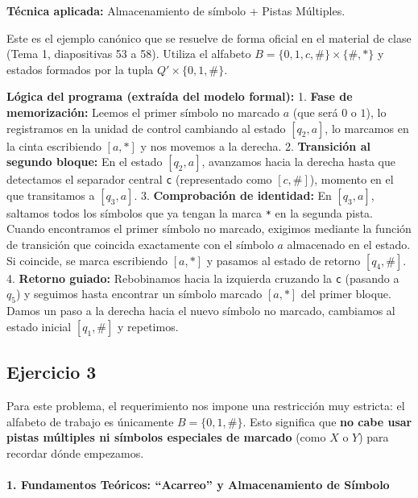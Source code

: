 \documentclass[12pt]{book} %
\begin{document}
\textbf{Técnica aplicada:} Almacenamiento de símbolo + Pistas Múltiples.

Este es el ejemplo canónico que se resuelve de forma oficial en el
material de clase (Tema 1, diapositivas 53 a 58). Utiliza el alfabeto
\(B = \{0, 1, c, \#\} \times \{\#, *\}\) y estados formados por la tupla
\(Q' \times \{0, 1, \#\}\).

\textbf{Lógica del programa (extraída del modelo formal):} 1.
\textbf{Fase de memorización:} Leemos el primer símbolo no marcado \(a\)
(que será \(0\) o \(1\)), lo registramos en la unidad de control
cambiando al estado \([q_2, a]\), lo marcamos en la cinta escribiendo
\([a, *]\) y nos movemos a la derecha. 2. \textbf{Transición al segundo
bloque:} En el estado \([q_2, a]\), avanzamos hacia la derecha hasta que
detectamos el separador central \texttt{c} (representado como
\([c, \#]\)), momento en el que transitamos a \([q_3, a]\). 3.
\textbf{Comprobación de identidad:} En \([q_3, a]\), saltamos todos los
símbolos que ya tengan la marca \texttt{*} en la segunda pista. Cuando
encontramos el primer símbolo no marcado, exigimos mediante la función
de transición que coincida exactamente con el símbolo \(a\) almacenado
en el estado. Si coincide, se marca escribiendo \([a, *]\) y pasamos al
estado de retorno \([q_4, \#]\). 4. \textbf{Retorno guiado:} Rebobinamos
hacia la izquierda cruzando la \texttt{c} (pasando a \(q_5\)) y seguimos
hasta encontrar un símbolo marcado \([a, *]\) del primer bloque. Damos
un paso a la derecha hacia el nuevo símbolo no marcado, cambiamos al
estado inicial \([q_1, \#]\) y repetimos.

\hypertarget{ejercicio-3}{%
\subsection{Ejercicio 3}\label{ejercicio-3}}

Para este problema, el requerimiento nos impone una restricción muy
estricta: el alfabeto de trabajo es únicamente \(B = \{0, 1, \#\}\).
Esto significa que \textbf{no cabe usar pistas múltiples ni símbolos
especiales de marcado} (como \(X\) o \(Y\)) para recordar dónde
empezamos.

\hypertarget{fundamentos-teuxf3ricos-acarreo-y-almacenamiento-de-suxedmbolo}{%
\paragraph{1. Fundamentos Teóricos: ``Acarreo'' y Almacenamiento de
Símbolo}\label{fundamentos-teuxf3ricos-acarreo-y-almacenamiento-de-suxedmbolo}}
\end{document}
